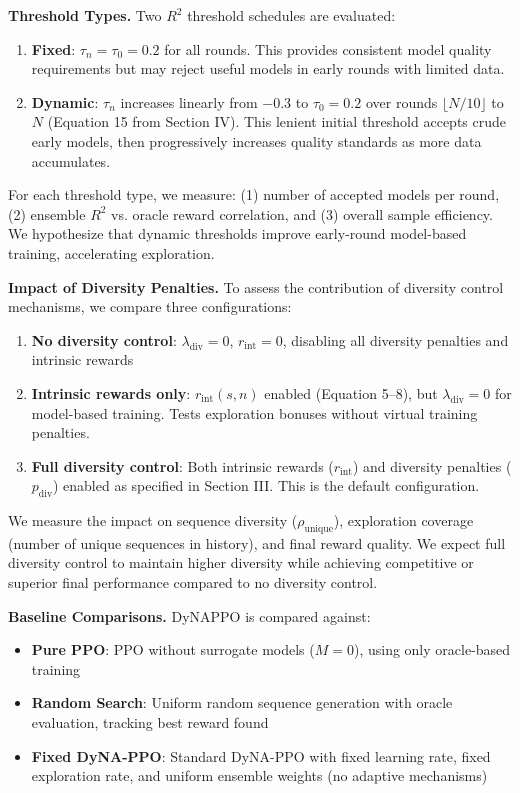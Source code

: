 \documentclass[conference]{IEEEtran}
\begin{document}
\textbf{Threshold Types.} Two $R^2$ threshold schedules are evaluated:
\begin{enumerate}
    \item \textbf{Fixed}: $\tau_n = \tau_0 = 0.2$ for all rounds. This provides consistent model quality requirements but may reject useful models in early rounds with limited data.

    \item \textbf{Dynamic}: $\tau_n$ increases linearly from $-0.3$ to $\tau_0 = 0.2$ over rounds $\lfloor N/10 \rfloor$ to $N$ (Equation 15 from Section IV). This lenient initial threshold accepts crude early models, then progressively increases quality standards as more data accumulates.
\end{enumerate}

For each threshold type, we measure: (1) number of accepted models per round, (2) ensemble $R^2$ vs. oracle reward correlation, and (3) overall sample efficiency. We hypothesize that dynamic thresholds improve early-round model-based training, accelerating exploration.

\textbf{Impact of Diversity Penalties.} To assess the contribution of diversity control mechanisms, we compare three configurations:
\begin{enumerate}
    \item \textbf{No diversity control}: $\lambda_{\text{div}} = 0$, $r_{\text{int}} = 0$, disabling all diversity penalties and intrinsic rewards

    \item \textbf{Intrinsic rewards only}: $r_{\text{int}}(s,n)$ enabled (Equation 5--8), but $\lambda_{\text{div}} = 0$ for model-based training. Tests exploration bonuses without virtual training penalties.

    \item \textbf{Full diversity control}: Both intrinsic rewards ($r_{\text{int}}$) and diversity penalties ($p_{\text{div}}$) enabled as specified in Section III. This is the default configuration.
\end{enumerate}

We measure the impact on sequence diversity ($\rho_{\text{unique}}$), exploration coverage (number of unique sequences in history), and final reward quality. We expect full diversity control to maintain higher diversity while achieving competitive or superior final performance compared to no diversity control.

\textbf{Baseline Comparisons.} DyNAPPO is compared against:
\begin{itemize}
    \item \textbf{Pure PPO}: PPO without surrogate models ($M = 0$), using only oracle-based training
    \item \textbf{Random Search}: Uniform random sequence generation with oracle evaluation, tracking best reward found
    \item \textbf{Fixed DyNA-PPO}: Standard DyNA-PPO with fixed learning rate, fixed exploration rate, and uniform ensemble weights (no adaptive mechanisms)
\end{itemize}
\end{document}
